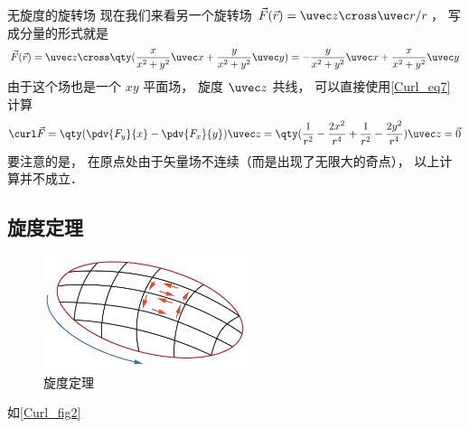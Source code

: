 \begin{exam}{无旋度的旋转场}
现在我们来看另一个旋转场 $\vec F(\vec r) = \uvec z\cross\uvec r /r$， 写成分量的形式就是
\begin{equation}
\vec F(\vec r) = \uvec z \cross \qty(\frac{x}{x^2 + y^2}\uvec x + \frac{y}{x^2 + y^2}\uvec y) = -\frac{y}{x^2 + y^2} \uvec x + \frac{x}{x^2 + y^2}\uvec y
\end{equation}
由于这个场也是一个 $xy$ 平面场， 旋度 $\uvec z$ 共线， 可以直接使用\autoref{Curl_eq7} 计算
\begin{equation}
\curl\vec F = \qty(\pdv{F_y}{x} - \pdv{F_x}{y})\uvec z = \qty(\frac{1}{r^2} - \frac{2x^2}{r^4} + \frac{1}{r^2} - \frac{2y^2}{r^4})\uvec z = \vec 0
\end{equation}
要注意的是， 在原点处由于矢量场不连续（而是出现了无限大的奇点）， 以上计算并不成立． 
\end{exam}

\subsection{旋度定理}

\begin{figure}[ht]
\centering
\includegraphics[width=6cm]{./figures/Curl2.pdf}
\caption{旋度定理} \label{Curl_fig2}
\end{figure}

如\autoref{Curl_fig2}